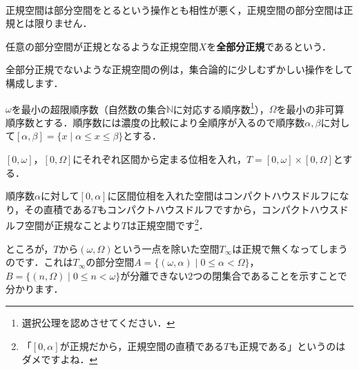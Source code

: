 　\par
正規空間は部分空間をとるという操作とも相性が悪く，正規空間の部分空間は正規とは限りません．
\begin{defm}[全部分正規]
任意の部分空間が正規となるような正規空間$X$を{\bf 全部分正規}であるという．
\end{defm}
全部分正規でないような正規空間の例は，集合論的に少しむずかしい操作をして構成します．
\begin{defm}
$\omega$を最小の超限順序数（自然数の集合$\mathbb{N}$に対応する順序数\footnote{選択公理を認めさせてください．}），$\Omega$を最小の非可算順序数とする．順序数には濃度の比較により全順序が入るので順序数$\alpha,\beta$に対して$[\alpha,\beta]=\{x\mid \alpha\leq x\leq \beta\}$とする．
\end{defm}
\begin{exm}[Tychonoffの板]
$[0,\omega]$，$[0,\Omega]$にそれぞれ区間から定まる位相を入れ，$T=[0,\omega]\times[0,\Omega]$とする．
\end{exm}
順序数$\alpha$に対して$[0,\alpha]$に区間位相を入れた空間はコンパクトハウスドルフになり，その直積である$T$もコンパクトハウスドルフですから，コンパクトハウスドルフ空間が正規なことより$T$は正規空間です\footnote{「$[0,\alpha]$が正規だから，正規空間の直積である$T$も正規である」というのはダメですよね．}．\par
ところが，$T$から$(\omega,\Omega)$という一点を除いた空間$T_{\infty}$は正規で無くなってしまうのです．これは$T_{\infty}$の部分空間$A=\{(\omega,\alpha)\mid 0\leq \alpha<\Omega\}$，$B=\{ (n,\Omega)\mid 0\leq n<\omega \}$が分離できない$2$つの閉集合であることを示すことで分かります．

